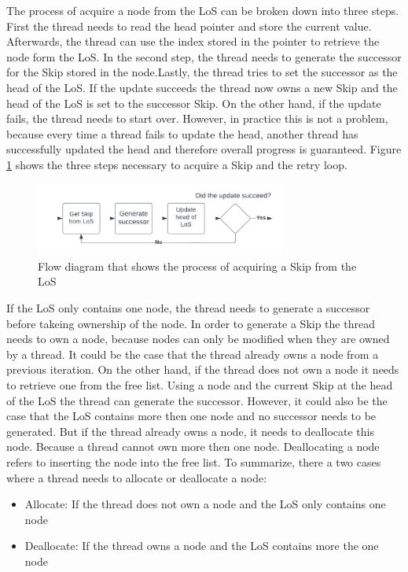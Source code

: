 \documentclass[sigconf,nonacm]{acmart}
\begin{document}
        The process of acquire a node from the LoS can be broken down into three steps. First the thread needs to read the head pointer and store the current value. Afterwards, the thread can use the index stored in the pointer to retrieve the node form the LoS. In the second step, the thread needs to generate the successor for the Skip stored in the node.Lastly, the thread tries to set the successor as the head of the LoS. If the update succeeds the thread now owns a new Skip and the head of the LoS is set to the successor Skip. On the other hand, if the update fails, the thread needs to start over. However, in practice this is not a problem, because every time a thread fails to update the head, another thread has successfully updated the head and therefore overall progress is guaranteed. Figure \ref{fig:acquire} shows the three steps necessary to acquire a Skip and the retry loop.
        \begin{figure}[h]
            \includegraphics[height=2.4cm]{figure5.pdf}
            \caption{Flow diagram that shows the process of acquiring a Skip from the LoS}
            \label{fig:acquire}
        \end{figure}

        If the LoS only contains one node, the thread needs to generate a successor before takeing ownership of the node. In order to generate a Skip the thread needs to own a node, because nodes can only be modified when they are owned by a thread. It could be the case that the thread already owns a node from a previous iteration. On the other hand, if the thread does not own a node it needs to retrieve one from the free list. Using a node and the current Skip at the head of the LoS the thread can generate the successor. However, it could also be the case that the LoS contains more then one node and no successor needs to be generated. But if the thread already owns a node, it needs to deallocate this node. Because a thread cannot own more then one node. Deallocating a node refers to inserting the node into the free list. To summarize, there a two cases where a thread needs to allocate or deallocate a node: 
        \begin{itemize}
            \item Allocate: If the thread does not own a node and the LoS only contains one node
            \item Deallocate: If the thread owns a node and the LoS contains more the one node
        \end{itemize}
\end{document}
